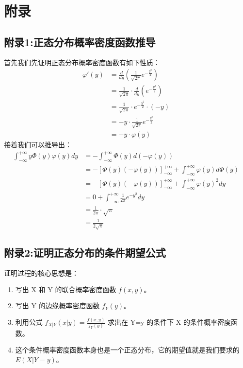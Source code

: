 \documentclass[UTF8]{ctexart}
\begin{document}
\section*{附录}

\subsection*{附录1:正态分布概率密度函数推导}
首先我们先证明正态分布概率密度函数有如下性质：
$$
\begin{align*}
    \varphi'(y) &= \frac{d}{dy}\left(\frac{1}{\sqrt{2\pi}}e^{-\frac{y^2}{2}}\right) \\
    &= \frac{1}{\sqrt{2\pi}} \cdot \frac{d}{dy}\left(e^{-\frac{y^2}{2}}\right) \\
    &= \frac{1}{\sqrt{2\pi}} \cdot e^{-\frac{y^2}{2}} \cdot \left(-y\right) \\
    &= -y \cdot \frac{1}{\sqrt{2\pi}}e^{-\frac{y^2}{2}} \\
    &= -y \cdot \varphi(y)
\end{align*}
$$
接着我们可以推导出：
$$
\begin{align*}
    \int_{-\infty}^{+\infty} y\Phi(y)\varphi(y)dy
    &= -\int_{-\infty}^{+\infty} \Phi(y)d(-\varphi(y)) \\
    &= -\left[\Phi(y)(-\varphi(y))\right]_{-\infty}^{+\infty} + \int_{-\infty}^{+\infty} \varphi(y)d\Phi(y) \\
    &= -\left[\Phi(y)(-\varphi(y))\right]_{-\infty}^{+\infty} + \int_{-\infty}^{+\infty} \varphi(y)^2 dy \\
    &= 0 + \int_{-\infty}^{+\infty} \frac{1}{2\pi}e^{-y^2} dy \\
    &= \frac{1}{2\pi} \cdot \sqrt{\pi} \\
    &= \frac{1}{2\sqrt{\pi}}
\end{align*}
$$

\subsection*{附录2:证明正态分布的条件期望公式}
\noindent 证明过程的核心思想是：
\begin{enumerate}
    \item 写出 X 和 Y 的联合概率密度函数 $f(x, y)$。
    \item 写出 Y 的边缘概率密度函数 $f_Y(y)$。
    \item 利用公式 $f_{X|Y}(x|y) = \frac{f(x, y)}{f_Y(y)}$ 求出在 Y=y 的条件下 X 的条件概率密度函数。
    \item 这个条件概率密度函数本身也是一个正态分布，它的期望值就是我们要求的 $E(X|Y=y)$。
\end{enumerate}
\end{document}
